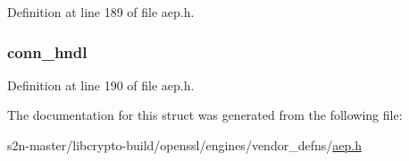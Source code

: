 Definition at line 189 of file aep.\+h.

\subsubsection[{\texorpdfstring{conn\+\_\+hndl}{conn_hndl}}]{ conn\+\_\+hndl}\hypertarget{struct_a_e_p___c_o_n_n_e_c_t_i_o_n___e_n_t_r_y_ab0a275d4fc3f9f9afd1bb9973ec58783}{}\label{struct_a_e_p___c_o_n_n_e_c_t_i_o_n___e_n_t_r_y_ab0a275d4fc3f9f9afd1bb9973ec58783}


Definition at line 190 of file aep.\+h.



The documentation for this struct was generated from the following file\+:\begin{DoxyCompactItemize}
\item 
s2n-\/master/libcrypto-\/build/openssl/engines/vendor\+\_\+defns/\hyperlink{aep_8h}{aep.\+h}\end{DoxyCompactItemize}

